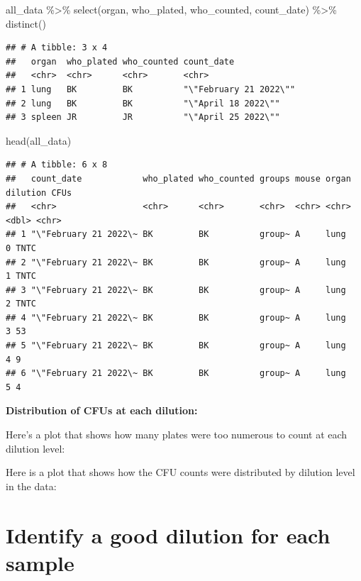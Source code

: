 \documentclass[
]{book}
\newenvironment{Shaded}{\begin{snugshade}}{\end{snugshade}}
\newcommand{\FunctionTok}[1]{\textcolor[rgb]{0.00,0.00,0.00}{#1}}
\newcommand{\NormalTok}[1]{#1}
\newcommand{\SpecialCharTok}[1]{\textcolor[rgb]{0.00,0.00,0.00}{#1}}
\begin{document}
\begin{Shaded}
\begin{Highlighting}[]
\NormalTok{all\_data }\SpecialCharTok{\%\textgreater{}\%}
  \FunctionTok{select}\NormalTok{(organ, who\_plated, who\_counted, count\_date) }\SpecialCharTok{\%\textgreater{}\%}
  \FunctionTok{distinct}\NormalTok{()}
\end{Highlighting}
\end{Shaded}

\begin{verbatim}
## # A tibble: 3 x 4
##   organ  who_plated who_counted count_date            
##   <chr>  <chr>      <chr>       <chr>                 
## 1 lung   BK         BK          "\"February 21 2022\""
## 2 lung   BK         BK          "\"April 18 2022\""   
## 3 spleen JR         JR          "\"April 25 2022\""
\end{verbatim}

\begin{Shaded}
\begin{Highlighting}[]
\FunctionTok{head}\NormalTok{(all\_data)}
\end{Highlighting}
\end{Shaded}

\begin{verbatim}
## # A tibble: 6 x 8
##   count_date            who_plated who_counted groups mouse organ dilution CFUs 
##   <chr>                 <chr>      <chr>       <chr>  <chr> <chr>    <dbl> <chr>
## 1 "\"February 21 2022\~ BK         BK          group~ A     lung         0 TNTC 
## 2 "\"February 21 2022\~ BK         BK          group~ A     lung         1 TNTC 
## 3 "\"February 21 2022\~ BK         BK          group~ A     lung         2 TNTC 
## 4 "\"February 21 2022\~ BK         BK          group~ A     lung         3 53   
## 5 "\"February 21 2022\~ BK         BK          group~ A     lung         4 9    
## 6 "\"February 21 2022\~ BK         BK          group~ A     lung         5 4
\end{verbatim}

\textbf{Distribution of CFUs at each dilution:}

Here's a plot that shows how many plates were too numerous to count at each
dilution level:

Here is a plot that shows how the CFU counts were distributed by dilution
level in the data:

\hypertarget{identify-a-good-dilution-for-each-sample}{%
\section{Identify a good dilution for each sample}\label{identify-a-good-dilution-for-each-sample}}
\end{document}

